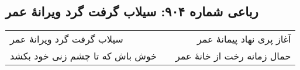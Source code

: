 \begin{center}
\section*{رباعی شماره ۹۰۴: سیلاب گرفت گرد ویرانهٔ عمر}
\label{sec:0904}
\begin{longtable}{l p{0.5cm} r}
سیلاب گرفت گرد ویرانهٔ عمر
&&
آغاز پری نهاد پیمانهٔ عمر
\\
خوش باش که تا چشم زنی خود بکشد
&&
حمال زمانه رخت از خانهٔ عمر
\\
\end{longtable}
\end{center}
